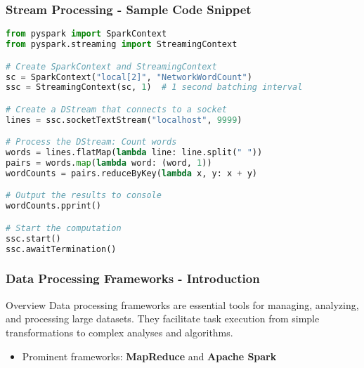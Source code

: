\documentclass[aspectratio=169]{beamer}
\begin{document}
\begin{frame}[fragile]
    \frametitle{Stream Processing - Sample Code Snippet}
    \begin{lstlisting}[language=Python]
from pyspark import SparkContext
from pyspark.streaming import StreamingContext

# Create SparkContext and StreamingContext
sc = SparkContext("local[2]", "NetworkWordCount")
ssc = StreamingContext(sc, 1)  # 1 second batching interval

# Create a DStream that connects to a socket
lines = ssc.socketTextStream("localhost", 9999)

# Process the DStream: Count words
words = lines.flatMap(lambda line: line.split(" "))
pairs = words.map(lambda word: (word, 1))
wordCounts = pairs.reduceByKey(lambda x, y: x + y)

# Output the results to console
wordCounts.pprint()

# Start the computation
ssc.start()
ssc.awaitTermination()
    \end{lstlisting}
\end{frame}

\begin{frame}[fragile]
    \frametitle{Data Processing Frameworks - Introduction}
    \begin{block}{Overview}
        Data processing frameworks are essential tools for managing, analyzing, and processing large datasets. They facilitate task execution from simple transformations to complex analyses and algorithms.
    \end{block}
    \begin{itemize}
        \item Prominent frameworks: \textbf{MapReduce} and \textbf{Apache Spark}
    \end{itemize}
\end{frame}
\end{document}
